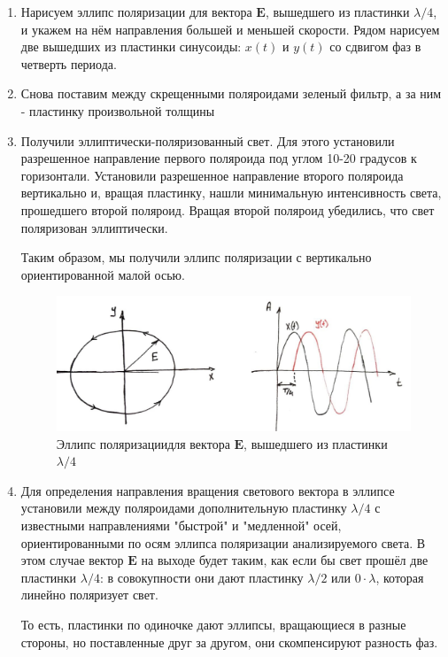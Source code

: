 \documentclass[a4paper,12pt]{article}
\begin{document}
\begin{enumerate}
    \item Нарисуем эллипс поляризации для вектора $\mathbf{E}$, вышедшего из пластинки $\lambda/4$, и укажем на нём направления большей и меньшей скорости. Рядом нарисуем две вышедших из пластинки синусоиды: $x(t)$ и $y(t)$ со сдвигом фаз в четверть периода.

    \item Снова поставим между скрещенными поляроидами зеленый фильтр, а за ним - пластинку произвольной толщины

    \item Получили эллиптически-поляризованный свет. Для этого установили разрешенное направление первого поляроида под углом 10-20 градусов к горизонтали. Установили разрешенное направление второго поляроида вертикально и, вращая пластинку, нашли минимальную интенсивность света, прошедшего второй поляроид. Вращая второй поляроид убедились, что свет поляризован эллиптически.

    Таким образом, мы получили эллипс поляризации с вертикально ориентированной малой осью.
    
    \begin{figure}[h]
    \begin{center}
        \includegraphics[width=0.9\linewidth]{img4.jpg}
    \end{center}
        \caption{Эллипс поляризациидля вектора $\mathbf{E}$, вышедшего из пластинки $\lambda/4$}
        \label{img9}
    \end{figure}

    \item Для определения направления вращения светового вектора в эллипсе установили между поляроидами дополнительную пластинку $\lambda/4$ с известными направлениями "быстрой" и "медленной" осей, ориентированными по осям эллипса поляризации анализируемого света. В этом случае вектор $\mathbf{E}$ на выходе будет таким, как если бы свет прошёл две пластинки $\lambda/4$: в совокупности они дают пластинку $\lambda/2$ или $0\cdot\lambda$, которая линейно поляризует свет.

    То есть, пластинки по одиночке дают эллипсы, вращающиеся в разные стороны, но поставленные друг за другом, они скомпенсируют разность фаз.

\end{enumerate}
\end{document}
